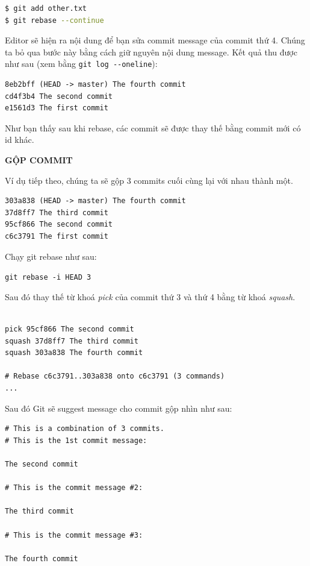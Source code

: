 \documentclass[a4paper, 11pt]{article}
\begin{document}
\begin{lstlisting}[language=bash]
$ git add other.txt
$ git rebase --continue
\end{lstlisting}

Editor sẽ hiện ra nội dung để bạn sửa commit message của commit thứ 4. Chúng ta bỏ qua bước này bằng cách giữ nguyên nội dung message. Kết quả thu được như sau (xem bằng \texttt{git log \texttt{-{}-oneline}}):

\begin{verbatim}
8eb2bff (HEAD -> master) The fourth commit
cd4f3b4 The second commit
e1561d3 The first commit
\end{verbatim}

Như bạn thấy sau khi rebase, các commit sẽ được thay thế bằng commit mới có id khác.

\textit{}

\textbf{GỘP COMMIT}

Ví dụ tiếp theo, chúng ta sẽ gộp 3 commits cuối cùng lại với nhau thành một.

\begin{verbatim}
303a838 (HEAD -> master) The fourth commit
37d8ff7 The third commit
95cf866 The second commit
c6c3791 The first commit
\end{verbatim}

Chạy git rebase như sau:

\texttt{git rebase -i HEAD\string~3}

Sau đó thay thế từ khoá \textit{pick} của commit thứ 3 và thứ 4 bằng từ khoá \textit{squash}.

\begin{verbatim}

pick 95cf866 The second commit
squash 37d8ff7 The third commit
squash 303a838 The fourth commit

# Rebase c6c3791..303a838 onto c6c3791 (3 commands)
...
\end{verbatim}

Sau đó Git sẽ suggest message cho commit gộp nhìn như sau:

\begin{verbatim}
# This is a combination of 3 commits.
# This is the 1st commit message:

The second commit

# This is the commit message #2:

The third commit

# This is the commit message #3:

The fourth commit
\end{verbatim}
\end{document}
